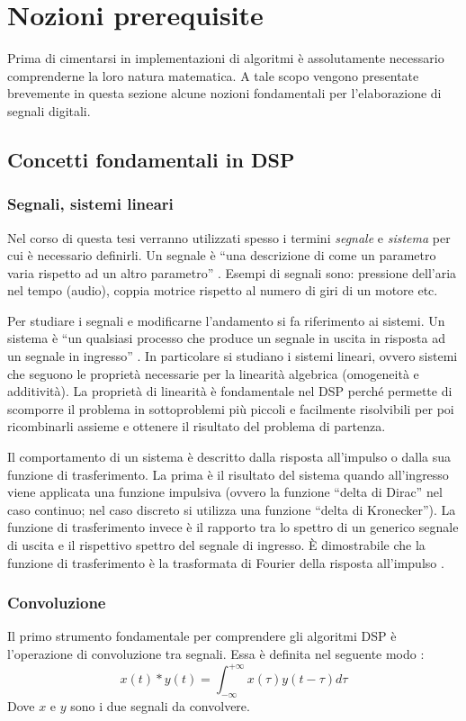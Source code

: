 \chapter{Nozioni prerequisite}
\label{cap:nozioni}
Prima di cimentarsi in implementazioni di algoritmi è assolutamente necessario comprenderne la loro natura matematica. A tale scopo vengono presentate brevemente in questa sezione alcune nozioni fondamentali per l'elaborazione di segnali digitali.

\section{Concetti fondamentali in DSP}
\subsection{Segnali, sistemi lineari}
Nel corso di questa tesi verranno utilizzati spesso i termini \textit{segnale} e \textit{sistema} per cui è necessario definirli. Un segnale è ``una descrizione di come un parametro varia rispetto ad un altro parametro'' \cite[pp.~87-88]{dspguide}. Esempi di segnali sono: pressione dell'aria nel tempo (audio), coppia motrice rispetto al numero di giri di un motore etc.

Per studiare i segnali e modificarne l'andamento si fa riferimento ai sistemi. Un sistema è ``un qualsiasi processo che produce un segnale in uscita in risposta ad un segnale in ingresso'' \cite[pp.~87-88]{dspguide}. In particolare si studiano i sistemi lineari, ovvero sistemi che seguono le proprietà necessarie per la linearità algebrica (omogeneità e additività). La proprietà di linearità è fondamentale nel DSP perché permette di scomporre il problema in sottoproblemi più piccoli e facilmente risolvibili per poi ricombinarli assieme e ottenere il risultato del problema di partenza.

Il comportamento di un sistema è descritto dalla risposta all'impulso o dalla sua funzione di trasferimento. La prima è il risultato del sistema quando all'ingresso viene applicata una funzione impulsiva (ovvero la funzione ``delta di Dirac'' nel caso continuo; nel caso discreto si utilizza una funzione ``delta di Kronecker''). La funzione di trasferimento invece è il rapporto tra lo spettro di un generico segnale di uscita e il rispettivo spettro del segnale di ingresso. È dimostrabile che la funzione di trasferimento è la trasformata di Fourier della risposta all'impulso \cite[pp.~3.29-3.31]{calandrino}.

\subsection{Convoluzione}
Il primo strumento fondamentale per comprendere gli algoritmi DSP è l'operazione di convoluzione tra segnali. Essa è definita nel seguente modo \cite[p.~2.10]{calandrino}:
\begin{equation}
    x(t) * y(t) = \int_{-\infty}^{+\infty}x(\tau)y(t-\tau)d\tau
\end{equation}
Dove $x$ e $y$ sono i due segnali da convolvere.

